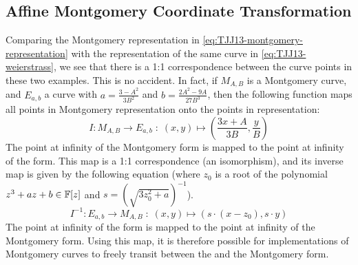 \subsection{Affine Montgomery Coordinate Transformation} Comparing the Montgomery representation in \eqref{eq:TJJ13-montgomery-representation} with the  representation of the same curve in \eqref{eq:TJJ13-weierstrass}, we see that there is a 1:1 correspondence between the curve points in these two examples. This is no accident. In fact, if $M_{A,B}$ is a Montgomery curve, and $E_{a,b}$ a  curve with $a = \frac{3-A^2}{3B^2}$ and $b= \frac{2A^2 -9A}{27B^3}$, then the following function maps all points in Montgomery representation onto the points in  representation:
\begin{equation}
I: M_{A,B} \to E_{a,b}\; : \; (x,y) \mapsto \left(\frac{3x + A}{3B}, \frac{y}{B}\right)
\end{equation}
The point at infinity of the Montgomery form is mapped to the point at infinity of the  form. This map is a 1:1 correspondence (an isomorphism), and its inverse map is given by the following equation (where $z_0$ is a root of the polynomial $z^3 + a z + b \in \mathbb{F}[z]$ and $s=({\sqrt{3z_0^{2}+a}})^{-1}$).
\begin{equation}
I^{-1}: E_{a,b} \to M_{A,B}\; : \; (x,y) \mapsto \left(s\cdot(x-z_0), s\cdot y\right)
\end{equation}
The point at infinity of the  form is mapped to the point at infinity of the Montgomery form. Using this map, it is therefore possible for implementations of Montgomery curves to freely transit between the  and the Montgomery form. 
 
